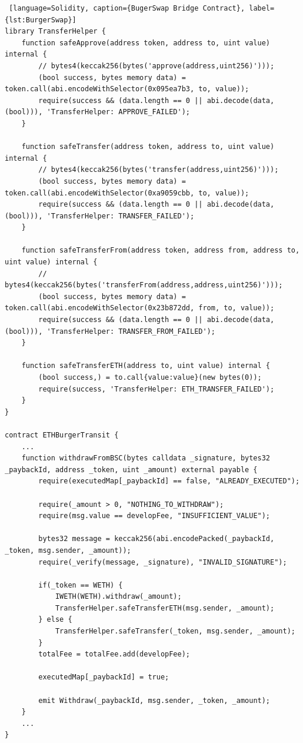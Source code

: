 \begin{lstlisting} [language=Solidity, caption={BugerSwap Bridge Contract}, label={lst:BurgerSwap}]
library TransferHelper {
    function safeApprove(address token, address to, uint value) internal {
        // bytes4(keccak256(bytes('approve(address,uint256)')));
        (bool success, bytes memory data) = token.call(abi.encodeWithSelector(0x095ea7b3, to, value));
        require(success && (data.length == 0 || abi.decode(data, (bool))), 'TransferHelper: APPROVE_FAILED');
    }

    function safeTransfer(address token, address to, uint value) internal {
        // bytes4(keccak256(bytes('transfer(address,uint256)')));
        (bool success, bytes memory data) = token.call(abi.encodeWithSelector(0xa9059cbb, to, value));
        require(success && (data.length == 0 || abi.decode(data, (bool))), 'TransferHelper: TRANSFER_FAILED');
    }

    function safeTransferFrom(address token, address from, address to, uint value) internal {
        // bytes4(keccak256(bytes('transferFrom(address,address,uint256)')));
        (bool success, bytes memory data) = token.call(abi.encodeWithSelector(0x23b872dd, from, to, value));
        require(success && (data.length == 0 || abi.decode(data, (bool))), 'TransferHelper: TRANSFER_FROM_FAILED');
    }

    function safeTransferETH(address to, uint value) internal {
        (bool success,) = to.call{value:value}(new bytes(0));
        require(success, 'TransferHelper: ETH_TRANSFER_FAILED');
    }
}

contract ETHBurgerTransit {
    ... 
    function withdrawFromBSC(bytes calldata _signature, bytes32 _paybackId, address _token, uint _amount) external payable {
        require(executedMap[_paybackId] == false, "ALREADY_EXECUTED");
        
        require(_amount > 0, "NOTHING_TO_WITHDRAW");
        require(msg.value == developFee, "INSUFFICIENT_VALUE");
        
        bytes32 message = keccak256(abi.encodePacked(_paybackId, _token, msg.sender, _amount));
        require(_verify(message, _signature), "INVALID_SIGNATURE");
        
        if(_token == WETH) {
            IWETH(WETH).withdraw(_amount);
            TransferHelper.safeTransferETH(msg.sender, _amount);
        } else {
            TransferHelper.safeTransfer(_token, msg.sender, _amount);
        }
        totalFee = totalFee.add(developFee);
        
        executedMap[_paybackId] = true;
        
        emit Withdraw(_paybackId, msg.sender, _token, _amount);
    }
    ... 
}
    
\end{lstlisting}
